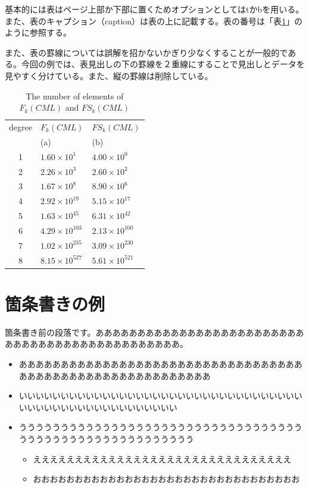 \documentclass[12pt,dvipdfmx]{jreport}
\begin{document}
 基本的には表はページ上部か下部に置くためオプションとしてはtかbを用いる。また、表のキャプション（caption）は表の上に記載する。表の番号は「表\ref{tab:num_of_schemata_satisfied_srp}」のように参照する。

また、表の罫線については誤解を招かないかぎり少なくすることが一般的である。今回の例では、表見出しの下の罫線を２重線にすることで見出しとデータを見やすく分けている。また、縦の罫線は削除している。
 
\begin{table}[tb]
 \centering
  \caption{The number of elements of $F_{k}(CML)$ and $FS_{k}(CML)$}
  \label{tab:num_of_schemata_satisfied_srp}
  \begin{tabular}{c l l}
    \hline
    degree & $F_{k}(CML)$ &$FS_{k}(CML)$ \\
    & (a)&  (b)\\ 
    \hline
    \hline
    1 &  $1.60 \times 10^{1}$ & $4.00 \times 10^{0}$\\
    2 & $2.26 \times 10^{3}$ & $2.60 \times 10^{2}$  \\
    3 & $1.67 \times 10^{8}$ & $8.90 \times 10^{6}$\\
    4 & $2.92 \times 10^{19}$ & $5.15 \times 10^{17}$\\
    5 & $1.63 \times 10^{45}$ & $6.31 \times 10^{42}$\\
    6 & $4.29 \times 10^{103}$ & $2.13 \times 10^{100}$\\
    7 & $1.02 \times 10^{235}$ & $3.09 \times 10^{230}$\\
    8 & $8.15 \times 10^{527}$ & $5.61 \times 10^{521}$\\ 
    \hline
  \end{tabular}
\end{table}

 \section{箇条書きの例}

箇条書き前の段落です。ああああああああああああああああああああああああああああああああああああああああああああああ。

\begin{itemize}
 \item あああああああああああああああああああああああああああああああああああああああああああああああああああああああああ
 \item いいいいいいいいいいいいいいいいいいいいいいいいいいいいいいいいいいいいいいいいいいいいいいいいいいいいい
 \item ううううううううううううううううううううううううううううううううううううううううううううううううううううううう
       \begin{itemize}
	\item えええええええええええええええええええええええええええええええ
	\item おおおおおおおおおおおおおおおおおおおおおおおおおおおおおおおお
       \end{itemize}
\end{itemize}
\end{document}
